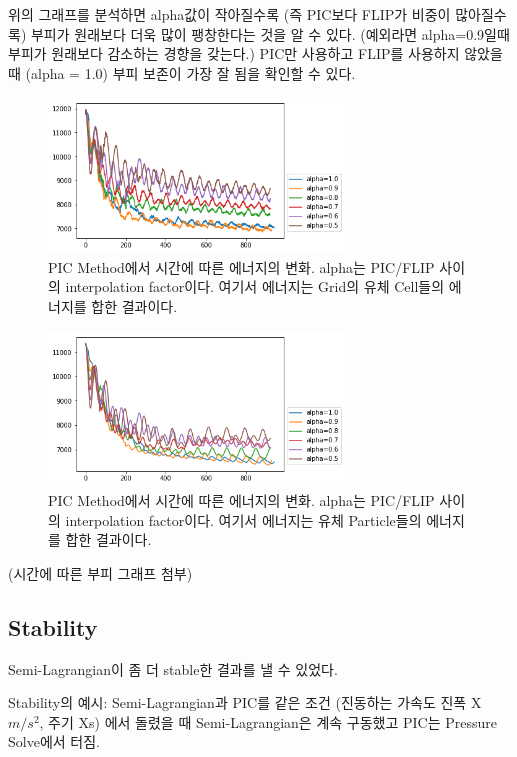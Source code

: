 \documentclass[10pt, A4]{article}
\begin{document}
위의 그래프를 분석하면 alpha값이 작아질수록 (즉 PIC보다 FLIP가 비중이 많아질수록) 부피가 원래보다 더욱 많이 팽창한다는 것을 알 수 있다. (예외라면 alpha=0.9일때 부피가 원래보다 감소하는 경향을 갖는다.) PIC만 사용하고 FLIP를 사용하지 않았을 때 (alpha = 1.0) 부피 보존이 가장 잘 됨을 확인할 수 있다.

\begin{figure}[h]
  \centering
  \includegraphics[width=0.7\textwidth]{picflip-energy-graph}
  \caption{PIC Method에서 시간에 따른 에너지의 변화. alpha는 PIC/FLIP 사이의 interpolation factor이다. 여기서 에너지는 Grid의 유체 Cell들의 에너지를 합한 결과이다.}
\end{figure}

\begin{figure}[h]
  \centering
  \includegraphics[width=0.7\textwidth]{picflip-particle-energy-graph}
  \caption{PIC Method에서 시간에 따른 에너지의 변화. alpha는 PIC/FLIP 사이의 interpolation factor이다. 여기서 에너지는 유체 Particle들의 에너지를 합한 결과이다.}
\end{figure}

(시간에 따른 부피 그래프 첨부)


\subsection{Stability}

Semi-Lagrangian이 좀 더 stable한 결과를 낼 수 있었다.

Stability의 예시: Semi-Lagrangian과 PIC를 같은 조건 (진동하는 가속도 진폭 X$m/s^2$, 주기 Xs) 에서 돌렸을 때 Semi-Lagrangian은 계속 구동했고 PIC는 Pressure Solve에서 터짐.
 
\end{document}
